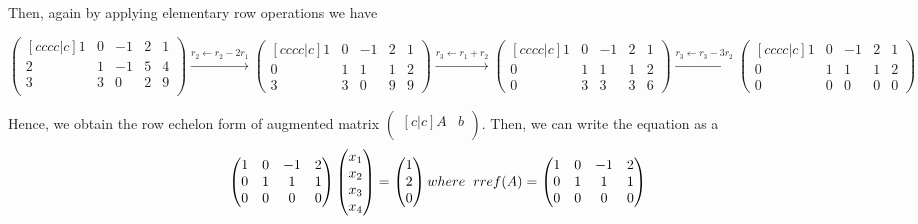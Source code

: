 \documentclass[12pt]{amsart}
\begin{document}
Then, again by applying elementary row operations we have 

\[
\begin{pmatrix}[cccc|c]
  1 & 0 & -1& 2& 1\\
  2 & 1 & -1& 5& 4 \\
  3 & 3 & 0& 2& 9 \\
\end{pmatrix}\overset{r_2 \leftarrow r_2-2r_1} {\longrightarrow} 
\begin{pmatrix}[cccc|c]
 1 & 0& -1& 2& 1 \\ 
 0&  1& 1& 1& 2\\ 
 3&  3& 0& 9& 9
\end{pmatrix}  \overset{r_3 \leftarrow r_1+r_2}{\longrightarrow} 
\begin{pmatrix}[cccc|c]
 1 & 0& -1& 2& 1 \\ 
 0&  1& 1& 1& 2\\ 
 0&  3& 3& 3& 6
\end{pmatrix} \overset{r_3 \leftarrow r_3-3r_2}{\longrightarrow} 
\begin{pmatrix}[cccc|c]
 1 & 0& -1& 2& 1\\ 
 0&  1& 1& 1& 2\\ 
 0&  0& 0& 0& 0
\end{pmatrix}
\]

Hence, we obtain the row echelon form of augmented matrix 
$
\begin{pmatrix}[c|c]
  A & b\\
\end{pmatrix}. 
$
Then, we can write the equation as a
\[
\begin{pmatrix}
 1 & 0& -1& 2\\ 
 0&  1& 1& 1\\ 
 0&  0& 0& 0
\end{pmatrix} 
\begin{pmatrix}
 x_{1}  \\ 
 x_{2}  \\ 
 x_{3}  \\
 x_{4}
\end{pmatrix} = 
\begin{pmatrix}
1 \\
2 \\
0
\end{pmatrix} where \hspace{2mm} rref(A) = 
\begin{pmatrix}
 1 & 0& -1& 2\\ 
 0&  1& 1& 1\\ 
 0&  0& 0& 0
\end{pmatrix} 
\]
\end{document}
